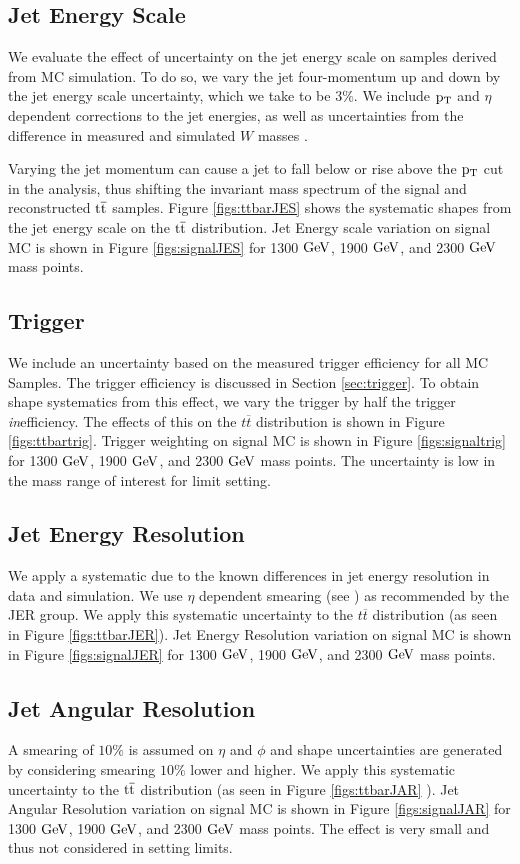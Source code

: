 \subsection{Jet Energy Scale}
We evaluate the effect of uncertainty on the jet energy scale on samples derived from MC simulation.  
To do so, we vary the jet four-momentum up and down by the jet energy 
scale uncertainty, which we take to be $3\%$. We include $\mathrm{p_{T}}$ and $\eta$ dependent corrections to the 
jet energies, as well as uncertainties from the difference in measured and simulated $W$ masses \cite{ZP8TeV}. 

Varying the jet momentum can cause a jet to fall below or rise above the $\mathrm{p_{T}}$ cut in the analysis, thus shifting the invariant 
mass spectrum of the signal and reconstructed $\mathrm{t\overline{t}}$ samples. Figure \ref{figs:ttbarJES} shows the systematic shapes from the 
jet energy scale on the $\mathrm{t\overline{t}}$ distribution.  Jet Energy scale variation on signal MC is shown in Figure \ref{figs:signalJES} for 1300$~\mathrm{GeV}$,
 1900$~\mathrm{GeV}$, and 2300$~\mathrm{GeV}$ mass points.

\subsection{Trigger}
We include an uncertainty based on the measured trigger efficiency for all MC Samples. The trigger efficiency is discussed in Section \ref{sec:trigger}. 
To obtain shape systematics from this effect, we vary the trigger by half the trigger \textit{in}efficiency. The effects of this on the $t\overline{t}$ 
distribution is shown in Figure \ref{figs:ttbartrig}. Trigger weighting on signal MC is shown in Figure \ref{figs:signaltrig} for 1300$~\mathrm{GeV}$,
 1900$~\mathrm{GeV}$, and 2300$~\mathrm{GeV}$ mass points.  The uncertainty is low in the mass range of interest for limit setting.

\subsection{Jet Energy Resolution}
\label{sec:JER}
We apply a systematic due to the known differences in jet energy resolution in data and simulation.  We use $\eta$ dependent smearing (see \cite{ZP8TeV}) as recommended by the JER group.  
We apply this systematic uncertainty to the $t\overline{t}$ distribution 
(as seen in Figure \ref{figs:ttbarJER}).  Jet Energy Resolution variation on signal MC is shown in Figure \ref{figs:signalJER} for 1300$~\mathrm{GeV}$,
 1900$~\mathrm{GeV}$, and 2300$~\mathrm{GeV}$ mass points. 

\subsection{Jet Angular Resolution}
A smearing of $10\%$ is assumed on $\eta$ and $\phi$ and shape uncertainties are generated by considering smearing $10\%$ 
lower and higher. We apply this systematic uncertainty to the $\mathrm{t\overline{t}}$ distribution (as seen in Figure \ref{figs:ttbarJAR} ). Jet Angular Resolution 
variation on signal MC is shown in Figure \ref{figs:signalJAR} for 1300$~\mathrm{GeV}$,
 1900$~\mathrm{GeV}$, and 2300$~\mathrm{GeV}$ mass points.  The effect is very small and thus not considered in setting limits.

